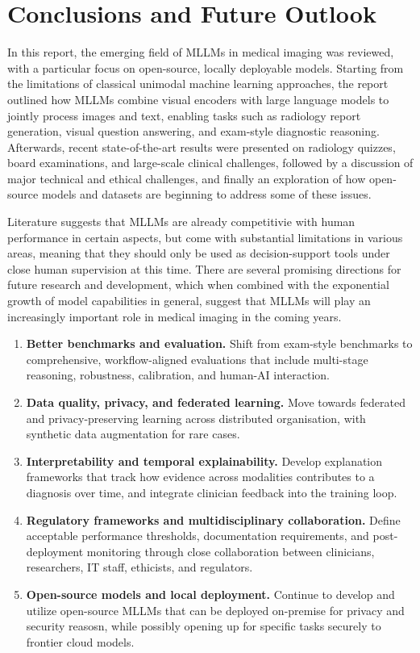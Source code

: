 \documentclass{imc-inf}
\begin{document}
\chapter{Conclusions and Future Outlook}

In this report, the emerging field of MLLMs in medical imaging was reviewed, with a particular focus on open-source, locally deployable models.
Starting from the limitations of classical unimodal machine learning approaches, the report outlined how MLLMs combine visual encoders with large language models to jointly process images and text, enabling tasks such as radiology report generation, visual question answering, and exam-style diagnostic reasoning.\cite{nam2025multimodal,rajendran2025foundation}
Afterwards, recent state-of-the-art results were presented on radiology quizzes, board examinations, and large-scale clinical challenges, followed by a discussion of major technical and ethical challenges, and finally an exploration of how open-source models and datasets are beginning to address some of these issues.

Literature suggests that MLLMs are already competitivie with human performance in certain aspects, but come with substantial limitations in various areas, meaning that they should only be used as decision-support tools under close human supervision at this time.
There are several promising directions for future research and development, which when combined with the exponential growth of model capabilities in general, suggest that MLLMs will play an increasingly important role in medical imaging in the coming years.

\begin{enumerate}
    \item \textbf{Better benchmarks and evaluation.} Shift from exam-style benchmarks to comprehensive, workflow-aligned evaluations that include multi-stage reasoning, robustness, calibration, and human-AI interaction.\cite{liu2025medq,peng2026omnibrainbench}
    \item \textbf{Data quality, privacy, and federated learning.} Move towards federated and privacy-preserving learning across distributed organisation, with synthetic data augmentation for rare cases.
    \item \textbf{Interpretability and temporal explainability.} Develop explanation frameworks that track how evidence across modalities contributes to a diagnosis over time, and integrate clinician feedback into the training loop.\cite{alsaad2024multimodal}
    \item \textbf{Regulatory frameworks and multidisciplinary collaboration.} Define acceptable performance thresholds, documentation requirements, and post-deployment monitoring through close collaboration between clinicians, researchers, IT staff, ethicists, and regulators.\cite{alsaad2024multimodal}
    \item \textbf{Open-source models and local deployment.} Continue to develop and utilize open-source MLLMs that can be deployed on-premise for privacy and security reasosn, while possibly opening up for specific tasks securely to frontier cloud models.
\end{enumerate}
\end{document}
